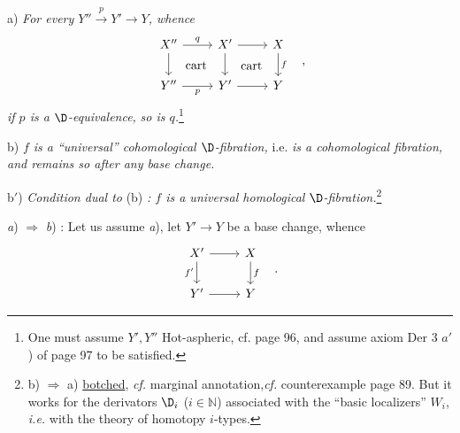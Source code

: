 \hspace*{\parindent}a) \textit{For every $Y'' \overset{p}{\to} Y' \to Y$, whence}
\[
\begin{tikzcd}
X'' \arrow[r, "q"] \arrow[d] \arrow[dr, phantom, "\text{cart}"] & X' \arrow[r] \arrow[d] \arrow[dr, phantom, "\text{cart}"] & X \arrow[d, "f"] \\
Y'' \arrow[r, "p"'] & Y' \arrow[r] & Y
\end{tikzcd}
\quad ,
\]
\textit{if $p$ is a $\D$-equivalence,} \textit{so is $q$.}\footnote[35]{One must assume $Y', Y''$ \textsf{Hot}-aspheric, cf. page 96, and assume axiom Der 3 $a'$) of page 97 to be satisfied.}

\hspace*{\parindent}b) \textit{$f$ is a ``universal'' cohomological $\D$-fibration,} i.e. \textit{is a cohomological fibration, and remains so after any base change.}

\hspace*{\parindent}b$'$) \textit{Condition dual to} (b) \textit{: $f$ is a universal homological $\D$-fibration.}\footnote[36]{b) $\Rightarrow$ a) \underline{botched}, \textit{cf.} marginal annotation,\footnotemark[37] \textit{cf.} counterexample page 89. But it works for the derivators $\D_i$ ($i \in \mathbb{N}$) associated with the ``basic localizers'' $W_i$, \textit{i.e.} with the theory of homotopy $i$-types.}

\textit{a}) $\Rightarrow$ \textit{b}) : Let us assume \textit{a}), let $Y' \to Y$ be a base change, whence
\[
\begin{tikzcd}
X' \arrow[r] \arrow[d, "f'"'] & X \arrow[d, "f"] \\
Y' \arrow[r] & Y
\end{tikzcd}
\quad .
\]
